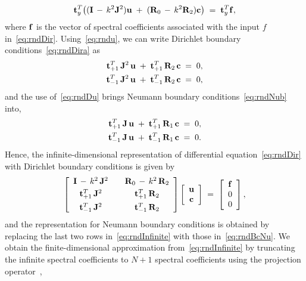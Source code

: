 \documentclass[%
secnumarabic,%
 amssymb, amsmath,%
 aps,prf,superscriptaddress,longbibliography
frontmatterverbose,
]{revtex4-2}
\begin{document}
\begin{align}\label{eq:rndDiff}
  \mathbf{t}_y^T \! \left( (\mathbf I \, - \, k^2 \mathbf J^2) \mathbf{u} \; +\; (\mathbf R_0 \,- \, k^2 \mathbf R_2) \mathbf{c} \right) \;=\; \mathbf{t}_y^T \mathbf{f},
\end{align}
where $\mathbf{f}$ is the vector of spectral coefficients associated with the input $f$ in~\eqref{eq:rndDir}. Using~\eqref{eq:rndu}, we can write Dirichlet boundary conditions~\eqref{eq:rndDira} as
\begin{align}\label{eq:rndBc}
  \begin{split}
  \mathbf{t}_{+1}^T \,\mathbf J^2\,\mathbf{u} \; + \;  \mathbf{t}_{+1}^T \,\mathbf{R}_2 \,\mathbf{c} \;&=\; 0,\\
  \mathbf{t}_{-1}^T \,\mathbf J^2\,\mathbf{u} \; + \;  \mathbf{t}_{-1}^T \,\mathbf{R}_2 \,\mathbf{c} \;&=\; 0,
\end{split}
\end{align}
and the use of~\eqref{eq:rndDu} brings Neumann boundary conditions~\eqref{eq:rndNub} into,
\begin{align}\label{eq:rndBcNu}
  \begin{split}
  \mathbf{t}_{+1}^T \,\mathbf J \, \mathbf{u} \; + \; \mathbf{t}_{+1}^T \,\mathbf{R}_1 \, \mathbf{c} \;&=\; 0,\\
  \mathbf{t}_{-1}^T \,\mathbf J \, \mathbf{u} \; + \;  \mathbf{t}_{-1}^T \, \mathbf{R}_1 \,\mathbf{c} \;&=\; 0.
\end{split}
\end{align}
Hence, the infinite-dimensional representation of differential equation~\eqref{eq:rndDir} with Dirichlet boundary conditions is given by
\begin{equation}\label{eq:rndInfinite}
  \left[\begin{array}{ccc}
    \mathbf I \, - \, k^2 \, \mathbf J^2 & & \mathbf R_0 \, - \, k^2 \, \mathbf R_2 \\[0.1cm]
    \mathbf{t}_{+1}^T \,\mathbf J^2 & & \mathbf{t}_{+1}^T \, \mathbf R_2 \\[0.15cm]
    \mathbf{t}_{-1}^T \,\mathbf J^2 & & \mathbf{t}_{-1}^T \, \mathbf R_2
  \end{array}\right]\left[\begin{array}{c}
    \mathbf{u}\\
    \mathbf{c}
  \end{array}\right] \;=\; \left[\begin{array}{c}
  \mathbf{f}\\
  0\\
  0
  \end{array}\right],
\end{equation}
and the representation for Neumann boundary conditions is obtained by replacing the last two rows in~\eqref{eq:rndInfinite} with those in~\eqref{eq:rndBcNu}. We obtain the finite-dimensional approximation from~\eqref{eq:rndInfinite} by truncating the infinite spectral coefficients to $N + 1$ spectral coefficients using the projection operator~\cite[Eq. 2.9, also last paragraph of Section 2.4]{OlvTowSIAM2013}, 
\end{document}
